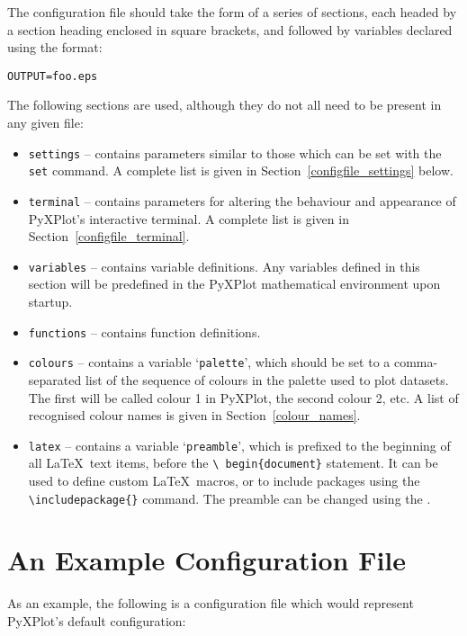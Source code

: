 The configuration file should take the form of a series of sections, each
headed by a section heading enclosed in square brackets, and followed by
variables declared using the format:

\begin{verbatim} 
OUTPUT=foo.eps
\end{verbatim}

The following sections are used, although they do not all need to be present in
any given file:

\begin{itemize}
\item {\tt settings} -- contains parameters similar to those which can be set
with the {\tt set} command. A complete list is given in
Section~\ref{configfile_settings} below.
\item {\tt terminal} -- contains parameters for altering the behaviour and
appearance of PyXPlot's interactive terminal. A complete list is given in
Section~\ref{configfile_terminal}.
\item {\tt variables} -- contains variable definitions. Any variables defined
in this section will be predefined in the PyXPlot mathematical environment upon
startup.
\item {\tt functions} -- contains function definitions.
\item {\tt colours} -- contains a variable `{\tt palette}', which should be set
to a comma-separated list of the sequence of colours in the palette used to
plot datasets. The first will be called colour 1 in PyXPlot, the second colour
2, etc. A list of recognised colour names is given in
Section~\ref{colour_names}.
\item {\tt latex} -- contains a variable `{\tt preamble}', which is prefixed to
the beginning of all \LaTeX\ text items, before the {\tt \textbackslash
begin\{document\}} statement. It can be used to define custom \LaTeX\ macros,
or to include packages using the {\tt \textbackslash includepackage\{\}}
command.  The preamble can be changed using the .
\end{itemize}

\section{An Example Configuration File}
\noindent As an example, the following is a configuration file
which would represent PyXPlot's default configuration:

